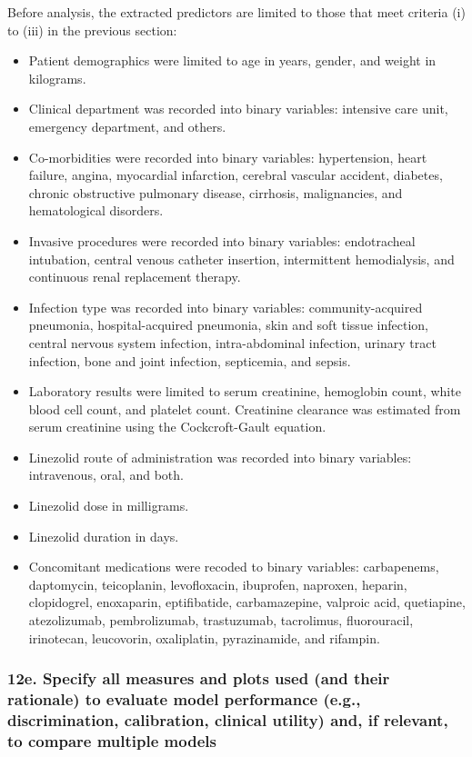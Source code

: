 \documentclass[
  letterpaper,
  DIV=11,
  numbers=noendperiod]{scrartcl}
\providecommand{\tightlist}{%
  \setlength{\itemsep}{0pt}\setlength{\parskip}{0pt}}\usepackage{longtable,booktabs,array}
\begin{document}
Before analysis, the extracted predictors are limited to those that meet
criteria (i) to (iii) in the previous section:

\begin{itemize}
\tightlist
\item
  Patient demographics were limited to age in years, gender, and weight
  in kilograms.
\item
  Clinical department was recorded into binary variables: intensive care
  unit, emergency department, and others.
\item
  Co-morbidities were recorded into binary variables: hypertension,
  heart failure, angina, myocardial infarction, cerebral vascular
  accident, diabetes, chronic obstructive pulmonary disease, cirrhosis,
  malignancies, and hematological disorders.
\item
  Invasive procedures were recorded into binary variables: endotracheal
  intubation, central venous catheter insertion, intermittent
  hemodialysis, and continuous renal replacement therapy.
\item
  Infection type was recorded into binary variables: community-acquired
  pneumonia, hospital-acquired pneumonia, skin and soft tissue
  infection, central nervous system infection, intra-abdominal
  infection, urinary tract infection, bone and joint infection,
  septicemia, and sepsis.
\item
  Laboratory results were limited to serum creatinine, hemoglobin count,
  white blood cell count, and platelet count. Creatinine clearance was
  estimated from serum creatinine using the Cockcroft-Gault equation.
\item
  Linezolid route of administration was recorded into binary variables:
  intravenous, oral, and both.
\item
  Linezolid dose in milligrams.
\item
  Linezolid duration in days.
\item
  Concomitant medications were recoded to binary variables: carbapenems,
  daptomycin, teicoplanin, levofloxacin, ibuprofen, naproxen, heparin,
  clopidogrel, enoxaparin, eptifibatide, carbamazepine, valproic acid,
  quetiapine, atezolizumab, pembrolizumab, trastuzumab, tacrolimus,
  fluorouracil, irinotecan, leucovorin, oxaliplatin, pyrazinamide, and
  rifampin.
\end{itemize}

\subsubsection{12e. Specify all measures and plots used (and their
rationale) to evaluate model performance (e.g., discrimination,
calibration, clinical utility) and, if relevant, to compare multiple
models}\label{e.-specify-all-measures-and-plots-used-and-their-rationale-to-evaluate-model-performance-e.g.-discrimination-calibration-clinical-utility-and-if-relevant-to-compare-multiple-models}
\end{document}
